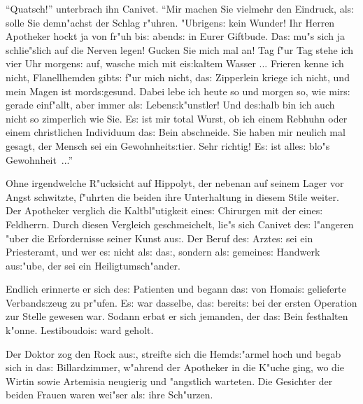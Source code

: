 \documentclass[oneside,12pt]{book}
\newcommand{\s}{s:}%
\begin{document}
"`Quatsch!"' unterbrach ihn Canivet. "`Mir machen Sie vielmehr den
Eindruck, al{\s} solle Sie demn"achst der Schlag r"uhren.
"Ubrigen{\s} kein Wunder! Ihr Herren Apotheker hockt ja von fr"uh
bi{\s} abend{\s} in Eurer Giftbude. Da{\s} mu"s sich ja
schlie"slich auf die Nerven legen! Gucken Sie mich mal an! Tag
f"ur Tag stehe ich vier Uhr morgen{\s} auf, wasche mich mit
ei{\s}kaltem Wasser ... Frieren kenne ich nicht, Flanellhemden
gibt{\s} f"ur mich nicht, da{\s} Zipperlein kriege ich nicht, und
mein Magen ist mord{\s}gesund. Dabei lebe ich heute so und morgen
so, wie mir{\s} gerade einf"allt, aber immer al{\s}
Leben{\s}k"unstler! Und de{\s}halb bin ich auch nicht so
zimperlich wie Sie. E{\s} ist mir total Wurst, ob ich einem Rebhuhn
oder einem christlichen Individuum da{\s} Bein abschneide. Sie
haben mir neulich mal gesagt, der Mensch sei ein Gewohnheit{\s}tier.
Sehr richtig! E{\s} ist alle{\s} blo"s Gewohnheit~..."'

Ohne irgendwelche R"ucksicht auf Hippolyt, der nebenan auf seinem
Lager vor Angst schwitzte, f"uhrten die beiden ihre Unterhaltung
in diesem Stile weiter. Der Apotheker verglich die Kaltbl"utigkeit
eine{\s} Chirurgen mit der eine{\s} Feldherrn. Durch diesen
Vergleich geschmeichelt, lie"s sich Canivet de{\s} l"angeren "uber
die Erfordernisse seiner Kunst au{\s}. Der Beruf de{\s} Arzte{\s}
sei ein Priesteramt, und wer e{\s} nicht al{\s} da{\s}, sondern
al{\s} gemeine{\s} Handwerk au{\s}"ube, der sei ein
Heiligtumsch"ander.

Endlich erinnerte er sich de{\s} Patienten und begann da{\s} von
Homai{\s} gelieferte Verband{\s}zeug zu pr"ufen. E{\s} war
dasselbe, da{\s} bereit{\s} bei der ersten Operation zur Stelle
gewesen war. Sodann erbat er sich jemanden, der da{\s} Bein
festhalten k"onne. Lestiboudoi{\s} ward geholt.

Der Doktor zog den Rock au{\s}, streifte sich die Hemd{\s}"armel
hoch und begab sich in da{\s} Billardzimmer, w"ahrend der
Apotheker in die K"uche ging, wo die Wirtin sowie Artemisia
neugierig und "angstlich warteten. Die Gesichter der beiden Frauen
waren wei"ser al{\s} ihre Sch"urzen.
\end{document}
